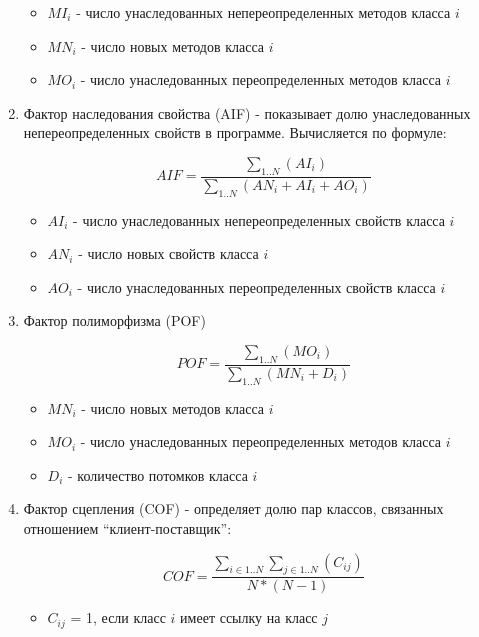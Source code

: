 \begin{enumerate}
    \begin{itemize}
        \item $MI_i$ - число унаследованных непереопределенных методов класса $i$
        \item $MN_i$ - число новых методов класса $i$
        \item $MO_i$ - число унаследованных переопределенных методов класса $i$
    \end{itemize}

    \item Фактор наследования свойства (AIF) - показывает долю унаследованных
    непереопределенных свойств в программе. Вычисляется по формуле:

    \begin{equation}
        AIF = \frac{\sum_{1..N}(AI_i)}{\sum_{1..N}(AN_i + AI_i + AO_i)}
    \end{equation}

    \begin{itemize}
        \item $AI_i$ - число унаследованных непереопределенных свойств класса $i$
        \item $AN_i$ - число новых свойств класса $i$
        \item $AO_i$ - число унаследованных переопределенных свойств класса $i$
    \end{itemize}

    \item Фактор полиморфизма (POF)

    \begin{equation}
        POF = \frac{\sum_{1..N}(MO_i)}{\sum_{1..N}(MN_i + D_i)}
    \end{equation}

    \begin{itemize}
        \item $MN_i$ - число новых методов класса $i$
        \item $MO_i$ - число унаследованных переопределенных методов класса $i$
        \item $D_i$ - количество потомков класса $i$
    \end{itemize}

    \item Фактор сцепления (COF) - определяет долю пар классов, связанных
    отношением ``клиент-поставщик'':

    \begin{equation}
        COF = \frac{\sum_{i \in 1..N}\sum_{j \in 1..N}(C_{ij})}{N * (N - 1)}
    \end{equation}

    \begin{itemize}
        \item $C_{ij}$ = 1, если класс $i$ имеет ссылку на класс $j$
    \end{itemize}
\end{enumerate}

